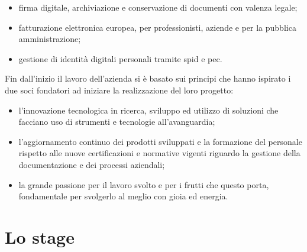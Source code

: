 \begin{itemize}
	\item firma digitale, archiviazione e conservazione di documenti con valenza legale;
	\item fatturazione elettronica europea, per professionisti, aziende e per la pubblica amministrazione;
	\item gestione di identità digitali personali tramite \gls{spid}\glsfirstoccur{} e \gls{pec}\glsfirstoccur.
\end{itemize}

Fin dall'inizio il lavoro dell'azienda si è basato sui principi che hanno ispirato i due soci fondatori ad iniziare la realizzazione del loro progetto:

\begin{itemize}
	\item l'innovazione tecnologica in ricerca, sviluppo ed utilizzo di soluzioni che facciano uso di strumenti e tecnologie all'avanguardia;
	\item l'aggiornamento continuo dei prodotti sviluppati e la formazione del personale rispetto alle nuove certificazioni e normative vigenti riguardo la gestione della documentazione e dei processi aziendali;
	\item la grande passione per il lavoro svolto e per i frutti che questo porta, fondamentale per svolgerlo al meglio con gioia ed energia.
\end{itemize}

\section{Lo stage}

